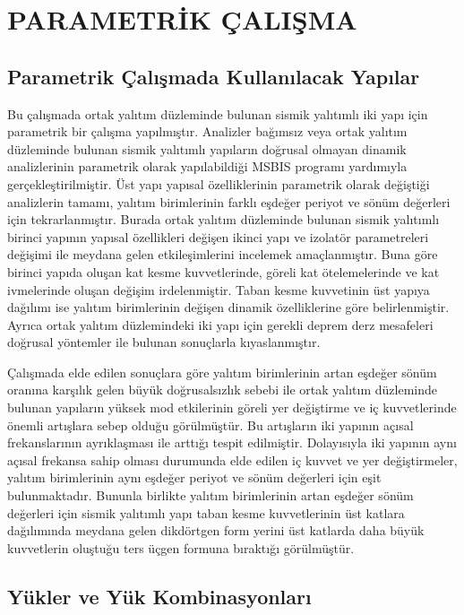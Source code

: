 
\chapter{PARAMETRİK ÇALIŞMA}

\section{Parametrik Çalışmada Kullanılacak Yapılar}

\label{CH4} 

Bu çalışmada ortak yalıtım düzleminde bulunan sismik yalıtımlı iki
yapı için parametrik bir çalışma yapılmıştır. Analizler bağımsız veya
ortak yalıtım düzleminde bulunan sismik yalıtımlı yapıların doğrusal
olmayan dinamik analizlerinin parametrik olarak yapılabildiği MSBIS
programı yardımıyla gerçekleştirilmiştir. Üst yapı yapısal özelliklerinin
parametrik olarak değiştiği analizlerin tamamı, yalıtım birimlerinin
farklı eşdeğer periyot ve sönüm değerleri için tekrarlanmıştır. Burada
ortak yalıtım düzleminde bulunan sismik yalıtımlı birinci yapının
yapısal özellikleri değişen ikinci yapı ve izolatör parametreleri
değişimi ile meydana gelen etkileşimlerini incelemek amaçlanmıştır.
Buna göre birinci yapıda oluşan kat kesme kuvvetlerinde, göreli kat
ötelemelerinde ve kat ivmelerinde oluşan değişim irdelenmiştir. Taban
kesme kuvvetinin üst yapıya dağılımı ise yalıtım birimlerinin değişen
dinamik özelliklerine göre belirlenmiştir. Ayrıca ortak yalıtım düzlemindeki
iki yapı için gerekli deprem derz mesafeleri doğrusal yöntemler ile
bulunan sonuçlarla kıyaslanmıştır.

Çalışmada elde edilen sonuçlara göre yalıtım birimlerinin artan eşdeğer
sönüm oranına karşılık gelen büyük doğrusalsızlık sebebi ile ortak
yalıtım düzleminde bulunan yapıların yüksek mod etkilerinin göreli
yer değiştirme ve iç kuvvetlerinde önemli artışlara sebep olduğu görülmüştür.
Bu artışların iki yapının açısal frekanslarının ayrıklaşması ile arttığı
tespit edilmiştir. Dolayısıyla iki yapının aynı açısal frekansa sahip
olması durumunda elde edilen iç kuvvet ve yer değiştirmeler, yalıtım
birimlerinin aynı eşdeğer periyot ve sönüm değerleri için eşit bulunmaktadır.
Bununla birlikte yalıtım birimlerinin artan eşdeğer sönüm değerleri
için sismik yalıtımlı yapı taban kesme kuvvetlerinin üst katlara dağılımında
meydana gelen dikdörtgen form yerini üst katlarda daha büyük kuvvetlerin
oluştuğu ters üçgen formuna bıraktığı görülmüştür.

\section{Yükler ve Yük Kombinasyonları}

